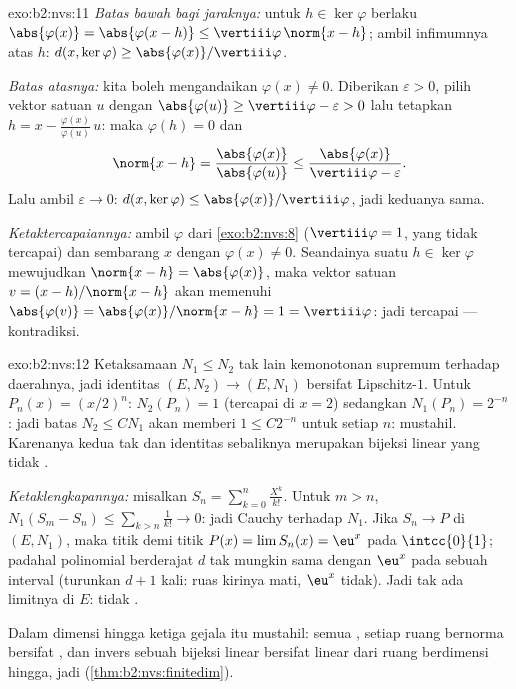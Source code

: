 \begin{solution}{exo:b2:nvs:11}
\emph{Batas bawah bagi jaraknya:} untuk $h \in \ker\varphi$ berlaku
$\abs{\varphi(x)} = \abs{\varphi(x - h)} \leq
\vertiii\varphi\,\norm{x - h}$; ambil infimumnya atas $h$:
$d(x, \ker\varphi) \geq \abs{\varphi(x)}/\vertiii\varphi$.

\emph{Batas atasnya:} kita boleh mengandaikan $\varphi(x) \neq 0$.
Diberikan $\varepsilon > 0$, pilih vektor satuan $u$ dengan
$\abs{\varphi(u)} \geq \vertiii\varphi - \varepsilon > 0$ lalu tetapkan
$h = x - \frac{\varphi(x)}{\varphi(u)}\,u$: maka $\varphi(h) = 0$ dan
\[
\norm{x - h} = \frac{\abs{\varphi(x)}}{\abs{\varphi(u)}}
\leq \frac{\abs{\varphi(x)}}{\vertiii\varphi - \varepsilon}.
\]
Lalu ambil $\varepsilon \to 0$: $d(x, \ker\varphi) \leq
\abs{\varphi(x)}/\vertiii\varphi$, jadi keduanya sama.

\emph{Ketaktercapaiannya:} ambil $\varphi$ dari \cref{exo:b2:nvs:8}
($\vertiii\varphi = 1$, yang tidak tercapai) dan sembarang $x$ dengan
$\varphi(x) \neq 0$. Seandainya suatu $h \in \ker\varphi$ mewujudkan
$\norm{x - h} = \abs{\varphi(x)}$, maka vektor satuan $v = (x -
h)/\norm{x - h}$ akan memenuhi $\abs{\varphi(v)} =
\abs{\varphi(x)}/\norm{x - h} = 1 = \vertiii\varphi$: jadi
 tercapai --- kontradiksi.
\end{solution}

\begin{solution}{exo:b2:nvs:12}
Ketaksamaan $N_1 \leq N_2$ tak lain kemonotonan supremum terhadap
daerahnya, jadi identitas $(E, N_2) \to (E, N_1)$ bersifat
Lipschitz-$1$. Untuk $P_n(x) = (x/2)^n$: $N_2(P_n) = 1$ (tercapai di $x =
2$) sedangkan $N_1(P_n) = 2^{-n}$: jadi batas $N_2 \leq CN_1$ akan
memberi $1 \leq C2^{-n}$ untuk setiap $n$: mustahil. Karenanya kedua
 tak  dan identitas sebaliknya merupakan bijeksi linear
yang tidak .

\emph{Ketaklengkapannya:} misalkan $S_n = \sum_{k=0}^{n}\frac{X^k}{k!}$.
Untuk $m > n$, $N_1(S_m - S_n) \leq \sum_{k>n}\frac1{k!} \to 0$: jadi
Cauchy terhadap $N_1$. Jika $S_n \to P$ di $(E, N_1)$, maka titik demi
titik $P(x) = \lim S_n(x) = \eu^x$ pada $\intcc{0}{1}$; padahal
polinomial berderajat $d$ tak mungkin sama dengan $\eu^x$ pada sebuah
interval (turunkan $d + 1$ kali: ruas kirinya mati, $\eu^x$ tidak). Jadi
tak ada limitnya di $E$: tidak .

Dalam dimensi hingga ketiga gejala itu mustahil: semua , setiap ruang bernorma bersifat , dan invers
sebuah bijeksi linear bersifat linear dari ruang berdimensi hingga,
jadi  (\cref{thm:b2:nvs:finitedim}).
\end{solution}

